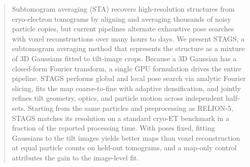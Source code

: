 \begin{abstract}
Subtomogram averaging (STA) recovers high-resolution structures from cryo-electron tomograms by aligning and averaging thousands of noisy particle copies, but current pipelines alternate exhaustive pose searches with voxel reconstructions over many hours to days.
We present STAGS, a subtomogram averaging method that represents the structure as a mixture of 3D Gaussians fitted to tilt-image crops.
Because a 3D Gaussian has a closed-form Fourier transform, a single GPU formulation drives the entire pipeline. STAGS performs global and local pose search via analytic Fourier slicing, fits the map coarse-to-fine with adaptive densification, and jointly refines tilt geometry, optics, and particle motion across independent half-sets.
Starting from the same particles and preprocessing as RELION-5, STAGS matches its resolution on a standard cryo-ET benchmark in a fraction of the reported processing time.
With poses fixed, fitting Gaussians to the tilt images yields better maps than voxel reconstruction at equal particle counts on held-out tomograms, and a map-only control attributes the gain to the image-level fit.
\end{abstract}